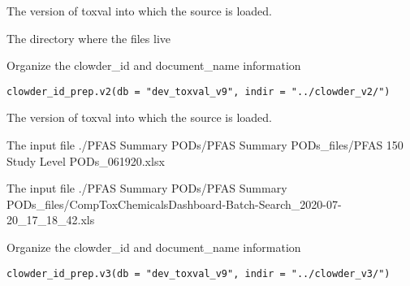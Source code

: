 \documentclass[letterpaper]{book}
\begin{document}
%
\begin{Arguments}
\begin{ldescription}
\item[\code{db}] The version of toxval into which the source is loaded.

\item[\code{dir}] The directory where the files live
\end{ldescription}
\end{Arguments}
%
\begin{Description}\relax
Organize the clowder\_id and document\_name information
\end{Description}
%
\begin{Usage}
\begin{verbatim}
clowder_id_prep.v2(db = "dev_toxval_v9", indir = "../clowder_v2/")
\end{verbatim}
\end{Usage}
%
\begin{Arguments}
\begin{ldescription}
\item[\code{db}] The version of toxval into which the source is loaded.

\item[\code{infile1}] The input file ./PFAS Summary PODs/PFAS Summary PODs\_files/PFAS 150 Study Level PODs\_061920.xlsx

\item[\code{infile2}] The input file ./PFAS Summary PODs/PFAS Summary PODs\_files/CompToxChemicalsDashboard-Batch-Search\_2020-07-20\_17\_18\_42.xls
\end{ldescription}
\end{Arguments}
%
\begin{Description}\relax
Organize the clowder\_id and document\_name information
\end{Description}
%
\begin{Usage}
\begin{verbatim}
clowder_id_prep.v3(db = "dev_toxval_v9", indir = "../clowder_v3/")
\end{verbatim}
\end{Usage}
%
\end{document}
